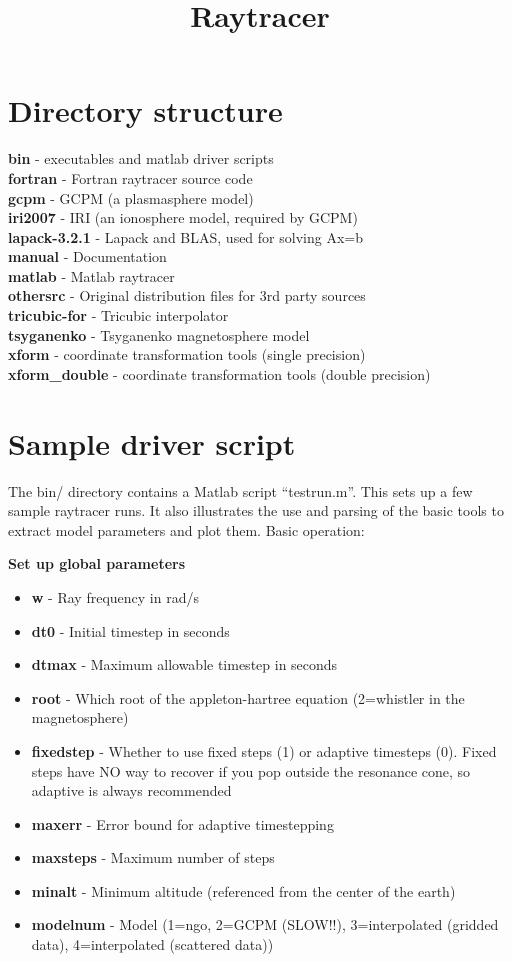 \documentclass[10pt]{article}
\begin{document}
\title{Raytracer}
\section{Directory structure}
{\bf bin} - executables and matlab driver scripts \\
{\bf fortran} - Fortran raytracer source code \\
{\bf gcpm} - GCPM (a plasmasphere model) \\
{\bf iri2007} - IRI (an ionosphere model, required by GCPM) \\
{\bf lapack-3.2.1} - Lapack and BLAS, used for solving Ax=b \\
{\bf manual} - Documentation \\
{\bf matlab} - Matlab raytracer \\
{\bf othersrc} - Original distribution files for 3rd party sources \\
{\bf tricubic-for} - Tricubic interpolator \\
{\bf tsyganenko} - Tsyganenko magnetosphere model \\
{\bf xform} - coordinate transformation tools (single precision) \\
{\bf xform\_double} - coordinate transformation tools (double
precision) \\

\section{Sample driver script}
The bin/ directory contains a Matlab script ``testrun.m''.  This sets
up a few sample raytracer runs.  It also illustrates the use and
parsing of the basic tools to extract model parameters and plot them.
Basic operation:

{\bf Set up global parameters}
\begin{itemize}
\item {\bf w} - Ray frequency in rad/s
\item {\bf dt0} - Initial timestep in seconds
\item {\bf dtmax} - Maximum allowable timestep in seconds
\item {\bf root} - Which root of the appleton-hartree equation
  (2=whistler in the magnetosphere)
\item {\bf fixedstep} - 
  Whether to use fixed steps (1) or adaptive timesteps (0).
  Fixed steps have NO way to recover if you pop outside the resonance
  cone, so adaptive is always recommended
\item {\bf maxerr} - Error bound for adaptive timestepping
\item {\bf maxsteps} - Maximum number of steps
\item {\bf minalt} - Minimum altitude (referenced from the center of
  the earth)
\item {\bf modelnum} - Model (1=ngo, 2=GCPM (SLOW!!), 3=interpolated
  (gridded data),
  4=interpolated (scattered data))
\end{itemize}
\end{document}
